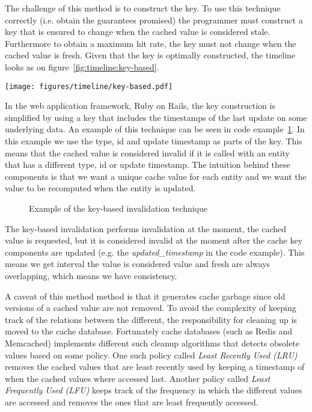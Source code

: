 The challenge of this method is to construct the key. To use this technique correctly (i.e. obtain the guarantees promised) the programmer must construct a key that is ensured to change when the cached value is considered stale. Furthermore to obtain a maximum hit rate, the key must not change when the cached value is fresh. Given that the key is optimally constructed, the timeline looks as on figure~\ref{fig:timeline:key-based}.

\begin{figure*}[ht!]
  \centering
  \texttt{[image: figures/timeline/key-based.pdf]}
  \caption{The lifecycle of the key-based invalidation technique}
  \label{fig:timeline:key-based}
\end{figure*}

In the web application framework, Ruby on Rails, the key construction is simplified by using a key that includes the timestamps of the last update on some underlying data. An example of this technique can be seen in code example~\ref{code:key-based-invalidation}. In this example we use the type, id and update timestamp as parts of the key. This means that the cached value is considered invalid if it is called with an entity that has a different type, id or update timestamp. The intuition behind these components is that we want a unique cache value for each entity and we want the value to be recomputed when the entity is updated.

\begin{figure}

\caption{Example of the key-based invalidation technique}
\label{code:key-based-invalidation}
\end{figure}

The key-based invalidation performs invalidation at the moment, the cached value is requested, but it is considered invalid at the moment after the cache key components are updated (e.g. the \emph{updated\_timestamp} in the code example). This means we get interval the value is considered value and fresh are always overlapping, which means we have consistency.

A caveat of this method method is that it generates cache garbage since old versions of a cached value are not removed. To avoid the complexity of keeping track of the relations between the different, the responsibility for cleaning up is moved to the cache database. Fortunately cache databases (such as Redis and Memcached) implements different such cleanup algorithms that detects obsolete values based on some policy. One such policy called \emph{Least Recently Used (LRU)} removes the cached values that are least recently used by keeping a timestamp of when the cached values where accessed last. Another policy called \emph{Least Frequently Used (LFU)} keeps track of the frequency in which the different values are accessed and removes the ones that are least frequently accessed.

